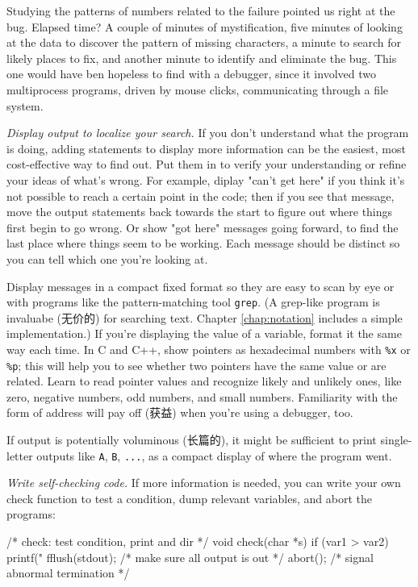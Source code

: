 Studying the patterns of numbers related to the failure pointed us right at
the bug. Elapsed time? A couple of minutes of mystification, five minutes
of looking at the data to discover the pattern of missing characters, a
minute to search for likely places to fix, and another minute to identify
and eliminate the bug. This one would have ben hopeless to find with a
debugger, since it involved two multiprocess programs, driven by mouse
clicks, communicating through a file system.

\emph{Display output to localize your search.} If you don't understand what
the program is doing, adding statements to display more information can be
the easiest, most cost-effective way to find out. Put them in to verify
your understanding or refine your ideas of what's wrong. For example,
diplay "can't get here" if you think it's not possible to reach a certain
point in the code; then if you see that message, move the output statements
back towards the start to figure out where things first begin to go wrong.
Or show "got here" messages going forward, to find the last place where
things seem to be working. Each message should be distinct so you can tell
which one you're looking at.

Display messages in a compact fixed format so they are easy to scan by eye
or with programs like the pattern-matching tool \verb'grep'. (A grep-like
program is invaluabe (无价的) for searching text. Chapter
\ref{chap:notation} includes a simple implementation.) If you're displaying
the value of a variable, format it the same way each time. In C and C++,
show pointers as hexadecimal numbers with \verb'%x' or \verb'%p'; this will
help you to see whether two pointers have the same value or are related.
Learn to read pointer values and recognize likely and unlikely ones, like
zero, negative numbers, odd numbers, and small numbers. Familiarity with
the form of address will pay off (获益) when you're using a debugger, too.

If output is potentially voluminous (长篇的), it might be sufficient to
print single-letter outputs like \verb'A', \verb'B', \verb'...', as a
compact display of where the program went.

\emph{Write self-checking code.} If more information is needed, you can
write your own check function to test a condition, dump relevant variables,
and abort the programs:
\begin{wellcode}
    /* check: test condition, print and dir */
    void check(char *s)
    {
        if (var1 > var2) {
            printf("%
            fflush(stdout); /* make sure all output is out */
            abort();        /* signal abnormal termination */
        }
    }
\end{wellcode}

